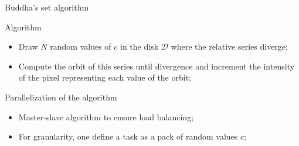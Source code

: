 \documentclass[compress,10pt,aspectratio=169]{beamer}
\begin{document}
\begin{frame}[fragile]{Buddha's set algorithm}
    \begin{exampleblock}{Algorithm}
        \begin{itemize}
            \item Draw $N$ random values of $c$ in the disk $\mathcal{D}$ where the relative series diverge;
            \item Compute the orbit of this series until divergence and increment the intensity of the pixel
                  representing each value of the orbit;            
        \end{itemize}
    \end{exampleblock}

    \begin{alertblock}{Parallelization of the algorithm}
        \begin{itemize}
            \item Master-slave algorithm to ensure load balancing;
            \item For granularity, one define a task as a pack of random values $c$;
        \end{itemize}
    \end{alertblock}
\end{frame}
\end{document}
